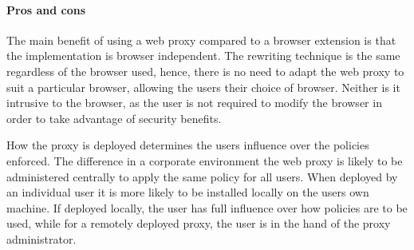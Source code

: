 \documentclass{llncs}
\newcommand{\todo}[1]{\colorbox{red}{\textcolor{white}{\sffamily\bfseries\scriptsize TODO}} \textcolor{red}{#1} \textcolor{red}{$\blacktriangleleft$}}
\begin{document}
\paragraph{Pros and cons}
The main benefit of using a web proxy 
compared to a browser extension is that the implementation is browser independent. The 
rewriting technique is the same regardless of the browser used, hence, there is no 
need to adapt the web proxy to suit a particular browser, allowing 
the users their choice of browser.
Neither is it intrusive to the browser, as the user is not required to modify the 
browser in order to take advantage of security benefits. 

How the proxy is 
deployed determines the users influence over 
the policies enforced.
The difference in a corporate environment the web proxy is likely to be 
administered centrally to apply the same policy for all users. When deployed by 
an individual user it is more likely to be installed locally on the users own machine.
If deployed locally, the user has full influence over 
how policies are to be used, while for a remotely deployed proxy, the user is 
in the hand of the proxy administrator. 



\end{document}
